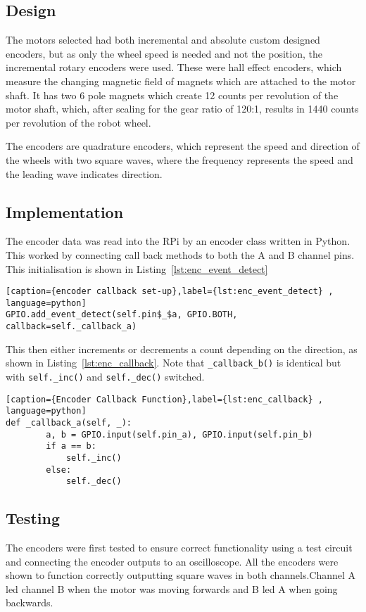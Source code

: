 \subsection{Design}\label{elec/encoder/design}
The motors selected had both incremental and absolute custom designed
encoders, but as only the wheel speed is needed and not the position,
the incremental rotary encoders were used. These were hall effect
encoders, which measure the changing magnetic field of magnets which
are attached to the motor shaft. It has two 6 pole magnets
which create 12 counts per revolution of the motor shaft, which, after
scaling for the gear ratio of 120:1, results in 1440 counts per
revolution of the robot wheel.

The encoders are quadrature encoders, which represent the speed and
direction of the wheels with two square waves, where the frequency
represents the speed and the leading wave indicates direction.

\subsection{Implementation}\label{elec/encoder/impl}

The encoder data was read into the RPi by an encoder class written in
Python. This worked by connecting call back methods to both the A and B
channel pins. This initialisation is shown in Listing~\ref{lst:enc_event_detect}

\begin{lstlisting}[caption={encoder callback set-up},label={lst:enc_event_detect} , language=python]
GPIO.add_event_detect(self.pin$_$a, GPIO.BOTH, callback=self._callback_a)
\end{lstlisting}

This then either increments or decrements a count depending on the
direction, as shown in Listing~\ref{lst:enc_callback}. Note that
\verb|_callback_b()| is identical but with \verb|self._inc()| and
\verb|self._dec()| switched.

\begin{lstlisting}[caption={Encoder Callback Function},label={lst:enc_callback} , language=python]
def _callback_a(self, _):
        a, b = GPIO.input(self.pin_a), GPIO.input(self.pin_b)
        if a == b:
            self._inc()
        else:
            self._dec()
\end{lstlisting}


\subsection{Testing}\label{elec/encoder/test}
The encoders were first tested to ensure correct functionality using a test circuit and connecting the encoder outputs to an
oscilloscope. All the encoders were shown to function correctly
outputting square waves in both channels.Channel A led channel B
when the motor was moving forwards and B led A when going backwards.

